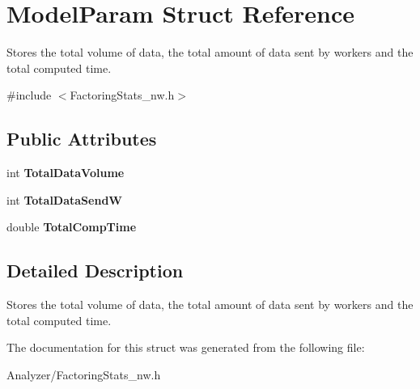 \hypertarget{struct_model_param}{\section{Model\-Param Struct Reference}
\label{struct_model_param}
}


Stores the total volume of data, the total amount of data sent by workers and the total computed time.  




{\ttfamily \#include $<$Factoring\-Stats\-\_\-nw.\-h$>$}

\subsection*{Public Attributes}
\begin{DoxyCompactItemize}
\item 
\hypertarget{struct_model_param_aaad2643381b3ba13d8d4ed96870d9dcd}{int {\bfseries Total\-Data\-Volume}}\label{struct_model_param_aaad2643381b3ba13d8d4ed96870d9dcd}

\item 
\hypertarget{struct_model_param_a51557b4c87cc22ed4af4fcbeaa9416ac}{int {\bfseries Total\-Data\-Send\-W}}\label{struct_model_param_a51557b4c87cc22ed4af4fcbeaa9416ac}

\item 
\hypertarget{struct_model_param_a879ce9946920b2c1846d9b0916ce6dad}{double {\bfseries Total\-Comp\-Time}}\label{struct_model_param_a879ce9946920b2c1846d9b0916ce6dad}

\end{DoxyCompactItemize}


\subsection{Detailed Description}
Stores the total volume of data, the total amount of data sent by workers and the total computed time. 

The documentation for this struct was generated from the following file\-:\begin{DoxyCompactItemize}
\item 
Analyzer/Factoring\-Stats\-\_\-nw.\-h\end{DoxyCompactItemize}
